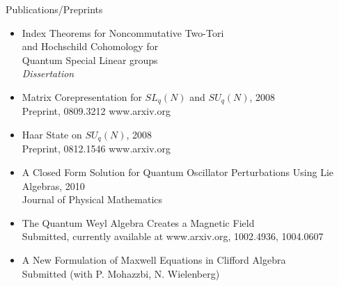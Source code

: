 \documentclass{resume} %
\begin{document}

\begin{rSection}{Publications/Preprints}

\begin{itemize}

\item Index Theorems for Noncommutative Two-Tori\\ 
and Hochschild Cohomology for \\
Quantum Special Linear groups\\
\emph{Dissertation}\\

\item Matrix Corepresentation for $SL_q(N)$ and $SU_q(N)$, 2008\\
Preprint, 0809.3212 www.arxiv.org\\

\item Haar State on $SU_q(N)$, 2008\\
Preprint, 0812.1546 www.arxiv.org\\

\item A Closed Form Solution for Quantum Oscillator Perturbations Using Lie Algebras, 2010\\
Journal of Physical Mathematics\\

\item The Quantum Weyl Algebra Creates a Magnetic Field\\
Submitted, currently available at www.arxiv.org, 1002.4936, 1004.0607\\

\item A New Formulation of Maxwell Equations in Clifford Algebra\\
Submitted (with P. Mohazzbi, N. Wielenberg)\\


\end{itemize}
\end{rSection}
\end{document}
